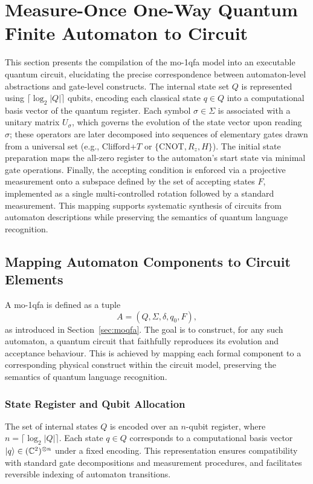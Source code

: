 \section{Measure-Once One-Way Quantum Finite Automaton to Circuit}
\label{sec:moqfa-to-circuit}

This section presents the compilation of the \gls{mo-1qfa} model into an executable quantum circuit, elucidating the precise correspondence between automaton-level abstractions and gate-level constructs. The internal state set $Q$ is represented using $\lceil\log_{2}|Q|\rceil$ qubits, encoding each classical state $q \in Q$ into a computational basis vector of the quantum register. Each symbol $\sigma \in \Sigma$ is associated with a unitary matrix $U_\sigma$, which governs the evolution of the state vector upon reading $\sigma$; these operators are later decomposed into sequences of elementary gates drawn from a universal set (e.g., Clifford+$T$ or $\{\mathrm{CNOT}, R_z, H\}$). The initial state preparation maps the all-zero register to the automaton's start state via minimal gate operations. Finally, the accepting condition is enforced via a projective measurement onto a subspace defined by the set of accepting states $F$, implemented as a single multi-controlled rotation followed by a standard measurement. This mapping supports systematic synthesis of circuits from automaton descriptions while preserving the semantics of quantum language recognition.

\subsection{Mapping Automaton Components to Circuit Elements}
A \gls{mo-1qfa} is defined as a tuple
\[
  A = (Q,\Sigma,\delta,q_0,F),
\]
as introduced in Section~\ref{sec:moqfa}. The goal is to construct, for any such automaton, a quantum circuit that faithfully reproduces its evolution and acceptance behaviour. This is achieved by mapping each formal component to a corresponding physical construct within the circuit model, preserving the semantics of quantum language recognition.

\subsubsection*{State Register and Qubit Allocation}
The set of internal states $Q$ is encoded over an $n$-qubit register, where $n = \lceil\log_2 |Q|\rceil$. Each state $q \in Q$ corresponds to a computational basis vector $\ket{q} \in (\mathbb{C}^2)^{\otimes n}$ under a fixed encoding. This representation ensures compatibility with standard gate decompositions and measurement procedures, and facilitates reversible indexing of automaton transitions.

